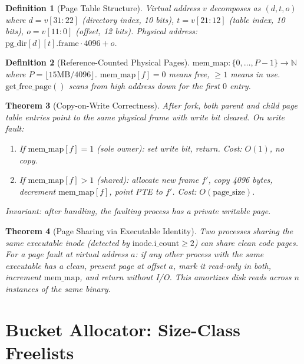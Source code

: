 \documentclass[11pt]{article}
\newtheorem{theorem}{Theorem}[section]
\newtheorem{definition}[theorem]{Definition}
\begin{document}
\begin{definition}[Page Table Structure]
Virtual address $v$ decomposes as $(d, t, o)$ where
$d = v[31:22]$ (directory index, 10 bits),
$t = v[21:12]$ (table index, 10 bits),
$o = v[11:0]$ (offset, 12 bits).
Physical address: $\text{pg\_dir}[d][t].\text{frame} \cdot 4096 + o$.
\end{definition}

\begin{definition}[Reference-Counted Physical Pages]
$\text{mem\_map}: \{0, \ldots, P-1\} \to \mathbb{N}$
where $P = \lfloor 15\text{MB} / 4096 \rfloor$.
$\text{mem\_map}[f] = 0$ means free, $\geq 1$ means in use.
$\text{get\_free\_page}()$ scans from high address down for the first $0$ entry.
\end{definition}

\begin{theorem}[Copy-on-Write Correctness]
After fork, both parent and child page table entries point to
the same physical frame with write bit cleared. On write fault:
\begin{enumerate}
\item If $\text{mem\_map}[f] = 1$ (sole owner): set write bit, return.
      Cost: $O(1)$, no copy.
\item If $\text{mem\_map}[f] > 1$ (shared): allocate new frame $f'$,
      copy 4096 bytes, decrement $\text{mem\_map}[f]$, point PTE to $f'$.
      Cost: $O(\text{page\_size})$.
\end{enumerate}
Invariant: after handling, the faulting process has a private writable page.
\end{theorem}

\begin{theorem}[Page Sharing via Executable Identity]
Two processes sharing the same executable inode (detected by
$\text{inode.i\_count} \geq 2$) can share clean code pages.
For a page fault at virtual address $a$:
if any other process with the same executable has a clean, present
page at offset $a$, mark it read-only in both, increment
$\text{mem\_map}$, and return without I/O.
This amortizes disk reads across $n$ instances of the same binary.
\end{theorem}


\section{Bucket Allocator: Size-Class Freelists}
\end{document}
